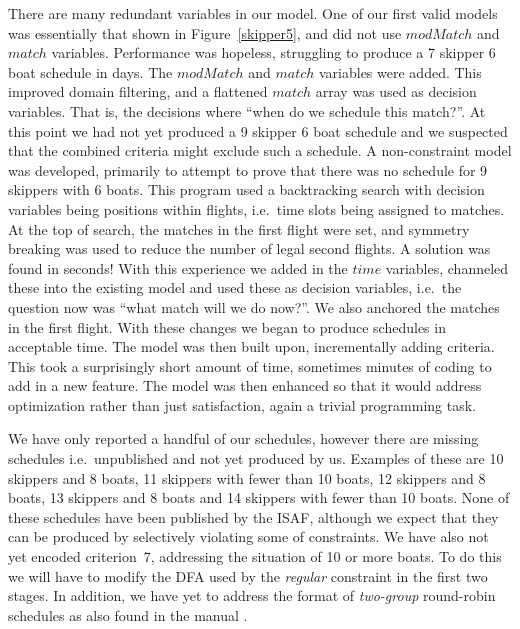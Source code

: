 \documentclass{llncs}
\newcommand{\match}{\mathit{match}}
\newcommand{\modMatch}{\mathit{modMatch}}
\newcommand{\timeVar}{\mathit{time}}
\begin{document}
There are many redundant variables in our model. One of our first valid models was essentially that
shown in Figure~\ref{skipper5}, and did not use $\modMatch$ and $\match$ variables. Performance was
hopeless, struggling to produce a 7 skipper 6 boat schedule in days. The $\modMatch$ and $\match$
variables were added. This improved domain filtering, and a flattened $\match$ array was used as
decision variables. That is, the decisions where ``when do we schedule this match?''.  At this point
we had not yet produced a 9 skipper 6 boat schedule and we suspected that the combined criteria
might exclude such a schedule. A non-constraint model was developed, primarily
to attempt to prove that there was no schedule for 9 skippers with 6 boats. This program used a
backtracking search with decision variables being positions within flights, i.e.\ time slots being
assigned to matches. At the top of search, the matches in the first flight were set, and symmetry
breaking was used to reduce the number of legal second flights. A solution was found in seconds!
With this experience we added in the $\timeVar$ variables, channeled these into the existing model
and used these as decision variables, i.e.\ the question now was ``what match will we do now?''. We
also anchored the matches in the first flight. With these changes we began to produce schedules in
acceptable time. The model was then built upon, incrementally adding criteria. This took a
surprisingly short amount of time, sometimes minutes of coding to add in a new feature. The model
was then enhanced so that it would address optimization rather than just satisfaction, again a
trivial programming task.

We have only reported a handful of our schedules, however there are missing schedules i.e.\ unpublished and not yet produced by us. Examples of
these are 10 skippers and 8 boats, 11 skippers with fewer than 10 boats, 12
skippers and 8 boats, 13 skippers and 8 boats and 14 skippers with fewer than 10 boats. None of these
schedules have been published by the ISAF, although we expect that they can be produced by
selectively violating some of constraints. We have also not yet encoded criterion~7, addressing the
situation of 10 or more boats. To do this we will have to modify the DFA used by the \emph{regular} constraint in the
first two stages. In addition, we have yet to address the format of
\emph{two-group} round-robin schedules as also found in the manual \cite{isaf}.
\end{document}
